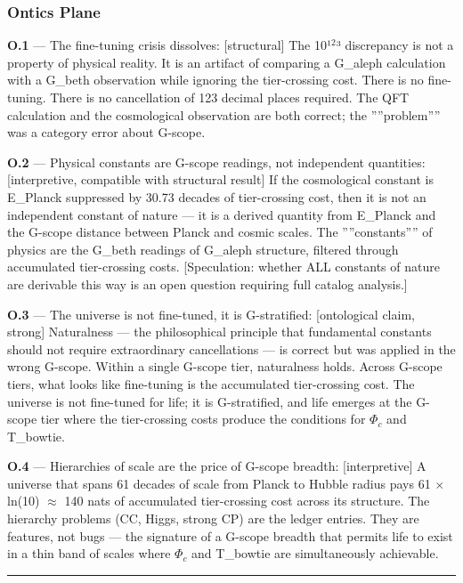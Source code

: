\documentclass[11pt,a4paper]{article}
\begin{document}
\subsubsection{Ontics Plane}

\textbf{O.1} --- The fine-tuning crisis dissolves: {[}structural{]} The 10¹$^{2}$³ discrepancy is not a property of physical reality. It is an artifact of comparing a G\_aleph calculation with a G\_beth observation while ignoring the tier-crossing cost. There is no fine-tuning. There is no cancellation of 123 decimal places required. The QFT calculation and the cosmological observation are both correct; the ''''problem'''' was a category error about G-scope.

\textbf{O.2} --- Physical constants are G-scope readings, not independent quantities: {[}interpretive, compatible with structural result{]} If the cosmological constant is E\_Planck suppressed by 30.73 decades of tier-crossing cost, then it is not an independent constant of nature --- it is a derived quantity from E\_Planck and the G-scope distance between Planck and cosmic scales. The ''''constants'''' of physics are the G\_beth readings of G\_aleph structure, filtered through accumulated tier-crossing costs. {[}Speculation: whether ALL constants of nature are derivable this way is an open question requiring full catalog analysis.{]}

\textbf{O.3} --- The universe is not fine-tuned, it is G-stratified: {[}ontological claim, strong{]} Naturalness --- the philosophical principle that fundamental constants should not require extraordinary cancellations --- is correct but was applied in the wrong G-scope. Within a single G-scope tier, naturalness holds. Across G-scope tiers, what looks like fine-tuning is the accumulated tier-crossing cost. The universe is not fine-tuned for life; it is G-stratified, and life emerges at the G-scope tier where the tier-crossing costs produce the conditions for $\Phi_c$ and T\_bowtie.

\textbf{O.4} --- Hierarchies of scale are the price of G-scope breadth: {[}interpretive{]} A universe that spans 61 decades of scale from Planck to Hubble radius pays 61 $\times$ ln(10) $\approx$ 140 nats of accumulated tier-crossing cost across its structure. The hierarchy problems (CC, Higgs, strong CP) are the ledger entries. They are features, not bugs --- the signature of a G-scope breadth that permits life to exist in a thin band of scales where $\Phi_c$ and T\_bowtie are simultaneously achievable.

\begin{center}
\rule{0.5\textwidth}{0.4pt}
\end{center}
\end{document}
